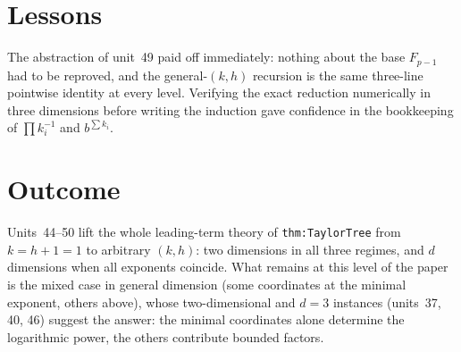 \documentclass[11pt]{article}
\begin{document}
\section{Lessons}
The abstraction of unit~49 paid off immediately: nothing about the base $F_{p-1}$ had to be reproved,
and the general-$(k,h)$ recursion is the same three-line pointwise identity at every level. Verifying
the exact reduction numerically in three dimensions before writing the induction gave confidence in
the bookkeeping of $\prod k_i^{-1}$ and $b^{\sum k_i}$.

\section{Outcome}
Units~44--50 lift the whole leading-term theory of \texttt{thm:TaylorTree} from $k=h+1=1$ to arbitrary
$(k,h)$: two dimensions in all three regimes, and $d$ dimensions when all exponents coincide. What
remains at this level of the paper is the mixed case in general dimension (some coordinates at the
minimal exponent, others above), whose two-dimensional and $d=3$ instances (units~37, 40, 46) suggest
the answer: the minimal coordinates alone determine the logarithmic power, the others contribute
bounded factors.
\end{document}
